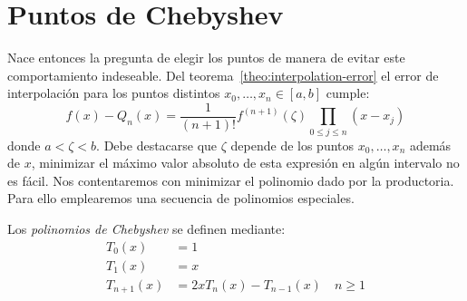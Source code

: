 \section{Puntos de Chebyshev}
\label{sec:puntos-de-chebyshev}

  Nace entonces la pregunta de elegir los puntos
  de manera de evitar este comportamiento indeseable.
  Del teorema~\ref{theo:interpolation-error}
  el error de interpolación para los puntos distintos
  \(x_0, \dotsc, x_n \in[a, b]\)
  cumple:
  \begin{equation}
    \label{eq:interpolation-error}
          f(x) - Q_n(x)
        = \frac{1}{(n + 1)!} f^{(n+1)}(\zeta)
            \prod_{0 \le j \le n}(x - x_j)
  \end{equation}
  donde \(a < \zeta < b\).
  Debe destacarse que \(\zeta\)
  depende de los puntos \(x_0, \dotsc, x_n\) además de \(x\),
  minimizar el máximo valor absoluto de esta expresión
  en algún intervalo no es fácil.
  Nos contentaremos con minimizar el polinomio dado por la productoria.
  Para ello emplearemos una secuencia de polinomios especiales.

  Los \emph{polinomios de Chebyshev}
  se definen mediante:
  \begin{equation}
    \label{eq:Chebyshev-recurrence}
    \begin{split}
      T_0(x)
        &= 1 \\
      T_1(x)
        &= x \\
      T_{n + 1}(x)
        &= 2 x T_n(x) - T_{n - 1}(x)
          \quad n \ge 1
    \end{split}
  \end{equation}

